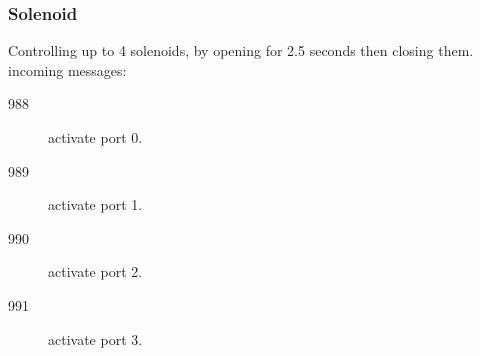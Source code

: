 \subsubsection{Solenoid}
Controlling up to 4 solenoids, by opening for 2.5 seconds then closing them.
incoming messages:
\begin{description}
  \item[988] activate port 0.
  \item[989] activate port 1.
  \item[990] activate port 2.
  \item[991] activate port 3.
\end{description}







